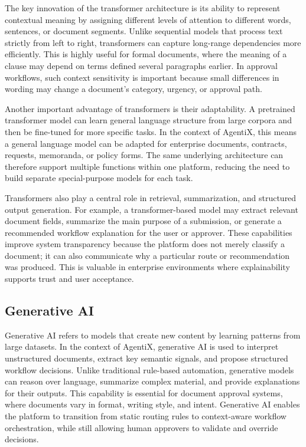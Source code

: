 \documentclass[12pt,oneside,openright,a4paper]{cpe-english-project}
\begin{document}
The key innovation of the transformer architecture is its ability to
represent contextual meaning by assigning different levels of attention
to different words, sentences, or document segments. Unlike sequential
models that process text strictly from left to right, transformers can
capture long-range dependencies more efficiently. This is highly useful
for formal documents, where the meaning of a clause may depend on terms
defined several paragraphs earlier. In approval workflows, such context
sensitivity is important because small differences in wording may change
a document's category, urgency, or approval path.

Another important advantage of transformers is their adaptability. A
pretrained transformer model can learn general language structure from
large corpora and then be fine-tuned for more specific tasks. In the
context of AgentiX, this means a general language model can be adapted
for enterprise documents, contracts, requests, memoranda, or policy
forms. The same underlying architecture can therefore support multiple
functions within one platform, reducing the need to build separate
special-purpose models for each task.

Transformers also play a central role in retrieval, summarization, and
structured output generation. For example, a transformer-based model may
extract relevant document fields, summarize the main purpose of a
submission, or generate a recommended workflow explanation for the user
or approver. These capabilities improve system transparency because the
platform does not merely classify a document; it can also communicate
why a particular route or recommendation was produced. This is valuable
in enterprise environments where explainability supports trust and user
acceptance.

\vspace{1em}

\subsection{Generative AI}

Generative AI refers to models that create new content by learning
patterns from large datasets. In the context of AgentiX, generative AI
is used to interpret unstructured documents, extract key semantic
signals, and propose structured workflow decisions. Unlike traditional
rule-based automation, generative models can reason over language,
summarize complex material, and provide explanations for their outputs.
This capability is essential for document approval systems, where
documents vary in format, writing style, and intent. Generative AI
enables the platform to transition from static routing rules to
context-aware workflow orchestration, while still allowing human
approvers to validate and override decisions.
\end{document}
